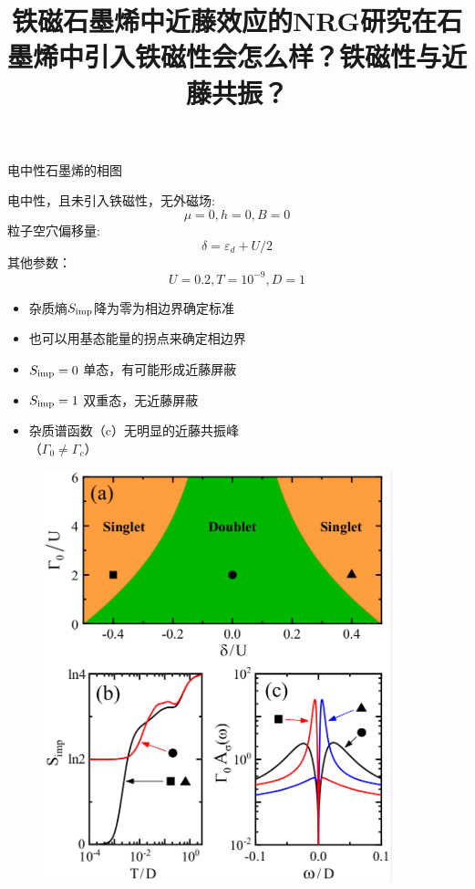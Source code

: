 \documentclass[9pt,t]{beamer} %
\begin{document}
\title{铁磁石墨烯中近藤效应的NRG研究\qquad \qquad 在石墨烯中引入铁磁性会怎么样？铁磁性与近藤共振？}
\begin{frame}{电中性石墨烯的相图}
\begin{minipage}[t]{0.5 \textwidth}
电中性，且未引入铁磁性，无外磁场:
\[\mu=0, h=0, B=0\]
粒子空穴偏移量:
\[\delta=\varepsilon_{d}+U/2\]
其他参数：
\[U=0.2,T=10^{-9},D=1\]
\vspace{-0.45cm}
\begin{itemize}
\item 杂质熵$S_{\rm{imp}}$降为零为相边界确定标准
\item 也可以用基态能量的拐点来确定相边界
\item $S_{\rm{imp}}=0$ 单态，有可能形成近藤屏蔽
\item $S_{\rm{imp}}=1$ 双重态，无近藤屏蔽
\item 杂质谱函数（c）无明显的近藤共振峰\\
（$\Gamma_{0} \neq \Gamma_{c}$）
\end{itemize}
\end{minipage}%
\begin{minipage}[t]{0.5 \textwidth}
\begin{figure}
\includegraphics[width=0.9\textwidth]{fig2.png}
\end{figure}
\end{minipage}
\vspace{0.1cm}
\end{frame}
\end{document}
